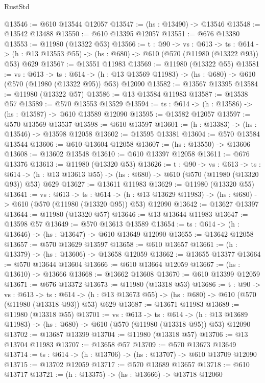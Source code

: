 \begin{lexlean}{RustStd}
\begin{coremodule}
@13546 := @610 @13544 @12057
@13547 := (hs : @13490) -> @13546
@13548 := @13542 @13488
@13550 := @610 @13395 @12057
@13551 := @676 @13380
@13553 := @11980 (@13322 @53)
@13566 := {t : @90} ->
  {vs : @613} ->
  {ts : @614} -> (h : @13 @13553 @55) -> (hs : @680) -> @610 (@570 (@11980 (@13322 @93)) @53) @629
@13567 := @13551 @11983
@13569 := @11980 (@13322 @55)
@13581 := {vs : @613} ->
  {ts : @614} ->
  (h : @13 @13569 @11983) -> (hs : @680) -> @610 (@570 (@11980 (@13322 @95)) @53) @12090
@13582 := @13567 @13395
@13584 := @11980 (@13322 @57)
@13586 := @13 @13584 @11983
@13587 := @13538 @57
@13589 := @570 @13553 @13529
@13594 := {ts : @614} -> (h : @13586) -> (hs : @13587) -> @610 @13589 @12090
@13595 := @13582 @12057
@13597 := @570 @13569 @13537
@13598 := @610 @13597
@13601 := (h : @13383) -> (hs : @13546) -> @13598 @12058
@13602 := @13595 @13381
@13604 := @570 @13584 @13544
@13606 := @610 @13604 @12058
@13607 := (hs : @13550) -> @13606
@13608 := @13602 @13548
@13610 := @610 @13397 @12058
@13611 := @676 @13376
@13613 := @11980 (@13320 @53)
@13626 := {t : @90} ->
  {vs : @613} ->
  {ts : @614} -> (h : @13 @13613 @55) -> (hs : @680) -> @610 (@570 (@11980 (@13320 @93)) @53) @629
@13627 := @13611 @11983
@13629 := @11980 (@13320 @55)
@13641 := {vs : @613} ->
  {ts : @614} ->
  (h : @13 @13629 @11983) -> (hs : @680) -> @610 (@570 (@11980 (@13320 @95)) @53) @12090
@13642 := @13627 @13397
@13644 := @11980 (@13320 @57)
@13646 := @13 @13644 @11983
@13647 := @13598 @57
@13649 := @570 @13613 @13589
@13654 := {ts : @614} -> (h : @13646) -> (hs : @13647) -> @610 @13649 @12090
@13655 := @13642 @12058
@13657 := @570 @13629 @13597
@13658 := @610 @13657
@13661 := (h : @13379) -> (hs : @13606) -> @13658 @12059
@13662 := @13655 @13377
@13664 := @570 @13644 @13604
@13666 := @610 @13664 @12059
@13667 := (hs : @13610) -> @13666
@13668 := @13662 @13608
@13670 := @610 @13399 @12059
@13671 := @676 @13372
@13673 := @11980 (@13318 @53)
@13686 := {t : @90} ->
  {vs : @613} ->
  {ts : @614} -> (h : @13 @13673 @55) -> (hs : @680) -> @610 (@570 (@11980 (@13318 @93)) @53) @629
@13687 := @13671 @11983
@13689 := @11980 (@13318 @55)
@13701 := {vs : @613} ->
  {ts : @614} ->
  (h : @13 @13689 @11983) -> (hs : @680) -> @610 (@570 (@11980 (@13318 @95)) @53) @12090
@13702 := @13687 @13399
@13704 := @11980 (@13318 @57)
@13706 := @13 @13704 @11983
@13707 := @13658 @57
@13709 := @570 @13673 @13649
@13714 := {ts : @614} -> (h : @13706) -> (hs : @13707) -> @610 @13709 @12090
@13715 := @13702 @12059
@13717 := @570 @13689 @13657
@13718 := @610 @13717
@13721 := (h : @13375) -> (hs : @13666) -> @13718 @12060

\end{coremodule}
\end{lexlean}
